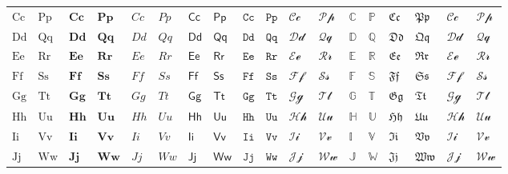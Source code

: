 {{\begin{longtable}{*{18}{l}}
            $\mathrm{Cc}$ & $\mathrm{Pp}$ & $\mathbf{Cc}$ & $\mathbf{Pp}$ & $\mathit{Cc}$ & $\mathit{Pp}$ & $\mathsf{Cc}$ & $\mathsf{Pp}$ & $\mathtt{Cc}$ & $\mathtt{Pp}$ & $\mathcal{Cc}$ & $\mathcal{Pp}$ & $\mathbb{C}$ & $\mathbb{P}$ & $\mathfrak{Cc}$ & $\mathfrak{Pp}$ & $\mathscr{Cc}$ & $\mathscr{Pp}$ \\
            $\mathrm{Dd}$ & $\mathrm{Qq}$ & $\mathbf{Dd}$ & $\mathbf{Qq}$ & $\mathit{Dd}$ & $\mathit{Qq}$ & $\mathsf{Dd}$ & $\mathsf{Qq}$ & $\mathtt{Dd}$ & $\mathtt{Qq}$ & $\mathcal{Dd}$ & $\mathcal{Qq}$ & $\mathbb{D}$ & $\mathbb{Q}$ & $\mathfrak{Dd}$ & $\mathfrak{Qq}$ & $\mathscr{Dd}$ & $\mathscr{Qq}$ \\
            $\mathrm{Ee}$ & $\mathrm{Rr}$ & $\mathbf{Ee}$ & $\mathbf{Rr}$ & $\mathit{Ee}$ & $\mathit{Rr}$ & $\mathsf{Ee}$ & $\mathsf{Rr}$ & $\mathtt{Ee}$ & $\mathtt{Rr}$ & $\mathcal{Ee}$ & $\mathcal{Rr}$ & $\mathbb{E}$ & $\mathbb{R}$ & $\mathfrak{Ee}$ & $\mathfrak{Rr}$ & $\mathscr{Ee}$ & $\mathscr{Rr}$ \\
            $\mathrm{Ff}$ & $\mathrm{Ss}$ & $\mathbf{Ff}$ & $\mathbf{Ss}$ & $\mathit{Ff}$ & $\mathit{Ss}$ & $\mathsf{Ff}$ & $\mathsf{Ss}$ & $\mathtt{Ff}$ & $\mathtt{Ss}$ & $\mathcal{Ff}$ & $\mathcal{Ss}$ & $\mathbb{F}$ & $\mathbb{S}$ & $\mathfrak{Ff}$ & $\mathfrak{Ss}$ & $\mathscr{Ff}$ & $\mathscr{Ss}$ \\
            $\mathrm{Gg}$ & $\mathrm{Tt}$ & $\mathbf{Gg}$ & $\mathbf{Tt}$ & $\mathit{Gg}$ & $\mathit{Tt}$ & $\mathsf{Gg}$ & $\mathsf{Tt}$ & $\mathtt{Gg}$ & $\mathtt{Tt}$ & $\mathcal{Gg}$ & $\mathcal{Tt}$ & $\mathbb{G}$ & $\mathbb{T}$ & $\mathfrak{Gg}$ & $\mathfrak{Tt}$ & $\mathscr{Gg}$ & $\mathscr{Tt}$ \\
            $\mathrm{Hh}$ & $\mathrm{Uu}$ & $\mathbf{Hh}$ & $\mathbf{Uu}$ & $\mathit{Hh}$ & $\mathit{Uu}$ & $\mathsf{Hh}$ & $\mathsf{Uu}$ & $\mathtt{Hh}$ & $\mathtt{Uu}$ & $\mathcal{Hh}$ & $\mathcal{Uu}$ & $\mathbb{H}$ & $\mathbb{U}$ & $\mathfrak{Hh}$ & $\mathfrak{Uu}$ & $\mathscr{Hh}$ & $\mathscr{Uu}$ \\
            $\mathrm{Ii}$ & $\mathrm{Vv}$ & $\mathbf{Ii}$ & $\mathbf{Vv}$ & $\mathit{Ii}$ & $\mathit{Vv}$ & $\mathsf{Ii}$ & $\mathsf{Vv}$ & $\mathtt{Ii}$ & $\mathtt{Vv}$ & $\mathcal{Ii}$ & $\mathcal{Vv}$ & $\mathbb{I}$ & $\mathbb{V}$ & $\mathfrak{Ii}$ & $\mathfrak{Vv}$ & $\mathscr{Ii}$ & $\mathscr{Vv}$ \\
            $\mathrm{Jj}$ & $\mathrm{Ww}$ & $\mathbf{Jj}$ & $\mathbf{Ww}$ & $\mathit{Jj}$ & $\mathit{Ww}$ & $\mathsf{Jj}$ & $\mathsf{Ww}$ & $\mathtt{Jj}$ & $\mathtt{Ww}$ & $\mathcal{Jj}$ & $\mathcal{Ww}$ & $\mathbb{J}$ & $\mathbb{W}$ & $\mathfrak{Jj}$ & $\mathfrak{Ww}$ & $\mathscr{Jj}$ & $\mathscr{Ww}$ \\

\end{longtable}}}
